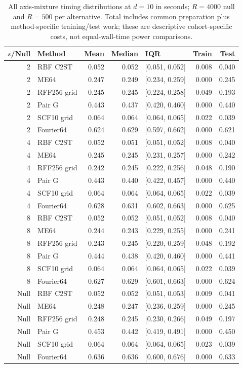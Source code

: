 \begin{table}[t]\centering\scriptsize
\caption{All axis-mixture timing distributions at $d=10$ in seconds; $R=4000$ null and $R=500$ per alternative. Total includes common preparation plus method-specific training/test work; these are descriptive cohort-specific costs, not equal-wall-time power comparisons.}
\label{tab:axis-runtime-d10}
{\setlength{\tabcolsep}{8pt}\renewcommand{\arraystretch}{1.2}
\begin{tabular}{rlrrlrr}
\toprule
$s$/Null & Method & Mean & Median & IQR & Train & Test\\
\midrule
2 & RBF C2ST & 0.052 & 0.052 & [0.051, 0.052] & 0.008 & 0.040\\
2 & ME64 & 0.247 & 0.249 & [0.234, 0.259] & 0.000 & 0.245\\
2 & RFF256 grid & 0.245 & 0.245 & [0.224, 0.258] & 0.049 & 0.193\\
2 & Pair G & 0.443 & 0.437 & [0.420, 0.460] & 0.000 & 0.440\\
2 & SCF10 grid & 0.064 & 0.064 & [0.064, 0.065] & 0.022 & 0.039\\
2 & Fourier64 & 0.624 & 0.629 & [0.597, 0.662] & 0.000 & 0.621\\
4 & RBF C2ST & 0.052 & 0.051 & [0.051, 0.052] & 0.008 & 0.040\\
4 & ME64 & 0.245 & 0.245 & [0.231, 0.257] & 0.000 & 0.242\\
4 & RFF256 grid & 0.242 & 0.245 & [0.222, 0.256] & 0.048 & 0.190\\
4 & Pair G & 0.443 & 0.440 & [0.422, 0.457] & 0.000 & 0.440\\
4 & SCF10 grid & 0.064 & 0.064 & [0.064, 0.065] & 0.022 & 0.039\\
4 & Fourier64 & 0.628 & 0.631 & [0.602, 0.663] & 0.000 & 0.625\\
8 & RBF C2ST & 0.052 & 0.052 & [0.051, 0.052] & 0.008 & 0.040\\
8 & ME64 & 0.244 & 0.243 & [0.229, 0.255] & 0.000 & 0.241\\
8 & RFF256 grid & 0.243 & 0.245 & [0.220, 0.259] & 0.048 & 0.192\\
8 & Pair G & 0.444 & 0.438 & [0.420, 0.460] & 0.000 & 0.441\\
8 & SCF10 grid & 0.064 & 0.064 & [0.064, 0.065] & 0.022 & 0.039\\
8 & Fourier64 & 0.627 & 0.629 & [0.601, 0.663] & 0.000 & 0.624\\
Null & RBF C2ST & 0.052 & 0.052 & [0.051, 0.053] & 0.009 & 0.041\\
Null & ME64 & 0.248 & 0.247 & [0.236, 0.259] & 0.000 & 0.245\\
Null & RFF256 grid & 0.248 & 0.245 & [0.230, 0.266] & 0.049 & 0.197\\
Null & Pair G & 0.453 & 0.442 & [0.419, 0.491] & 0.000 & 0.450\\
Null & SCF10 grid & 0.064 & 0.064 & [0.064, 0.065] & 0.023 & 0.039\\
Null & Fourier64 & 0.636 & 0.636 & [0.600, 0.676] & 0.000 & 0.633\\
\bottomrule
\end{tabular}}
\end{table}

